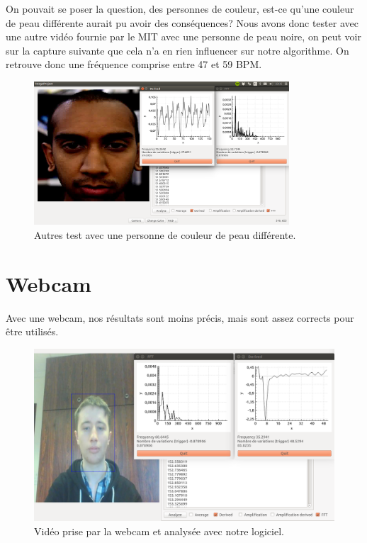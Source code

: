 On pouvait se poser la question, des personnes de couleur, est-ce qu'une couleur de peau différente aurait pu avoir des conséquences? Nous avons
donc tester avec une autre vidéo fournie par le MIT avec une personne de peau noire, on peut voir sur la capture suivante que cela n'a en rien influencer
sur notre algorithme. On retrouve donc une fréquence comprise entre 47 et 59 BPM\@.

\begin{figure}[h!]
	\centering
	\includegraphics[width=0.85\textwidth]{data/logi.png}
	\caption{Autres test avec une personne de couleur de peau différente.}
\end{figure}


\section{Webcam}

Avec une webcam, nos résultats sont moins précis, mais sont assez corrects pour être utilisés.

\begin{figure}[h!]
	\centering
	\includegraphics[width=1\textwidth]{data/webcam.png}
	\caption{Vidéo prise par la webcam et analysée avec notre logiciel.}
\end{figure}

